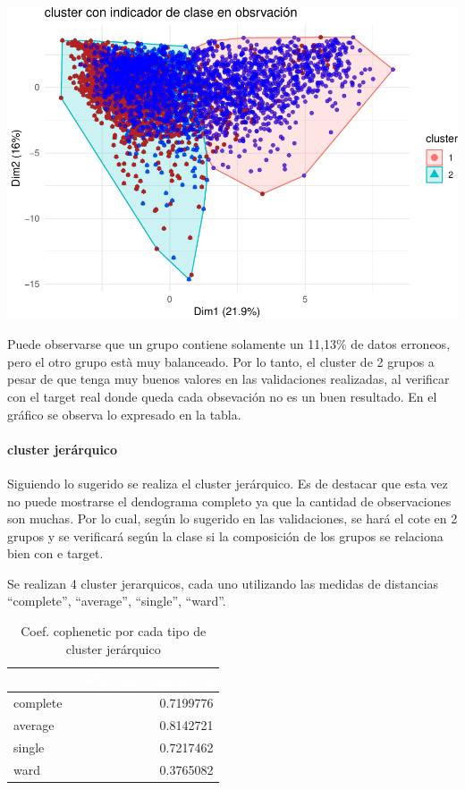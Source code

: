 \documentclass[]{article}
\let\oldparagraph\paragraph
\renewcommand{\paragraph}[1]{\oldparagraph{#1}\mbox{}}
\begin{document}
\includegraphics{00_pca_tsne_cluster_files/figure-latex/unnamed-chunk-21-1.pdf}

Puede observarse que un grupo contiene solamente un 11,13\% de datos
erroneos, pero el otro grupo està muy balanceado. Por lo tanto, el
cluster de 2 grupos a pesar de que tenga muy buenos valores en las
validaciones realizadas, al verificar con el target real donde queda
cada obsevación no es un buen resultado. En el gráfico se observa lo
expresado en la tabla.

\hypertarget{cluster-jeruxe1rquico}{%
\paragraph{cluster jerárquico}\label{cluster-jeruxe1rquico}}

Siguiendo lo sugerido se realiza el cluster jerárquico. Es de destacar
que esta vez no puede mostrarse el dendograma completo ya que la
cantidad de observaciones son muchas. Por lo cual, según lo sugerido en
las validaciones, se hará el cote en 2 grupos y se verificará según la
clase si la composición de los grupos se relaciona bien con e target.

Se realizan 4 cluster jerarquicos, cada uno utilizando las medidas de
distancias ``complete'', ``average'', ``single'', ``ward''.

\begin{table}[!h]

\caption{\label{tab:tabla_cophenetic_jerarquico}Coef. cophenetic por cada tipo de cluster jerárquico}
\centering
\begin{tabular}[t]{lr}
\toprule
\rowcolor{black}  \multicolumn{1}{c}{\textcolor{white}{\textbf{metodo}}} & \multicolumn{1}{c}{\textcolor{white}{\textbf{coeficiente\_cofenetico}}}\\
\midrule
\rowcolor{gray!6}  complete & 0.7199776\\
average & 0.8142721\\
\rowcolor{gray!6}  single & 0.7217462\\
ward & 0.3765082\\
\bottomrule
\end{tabular}
\end{table}
\end{document}
